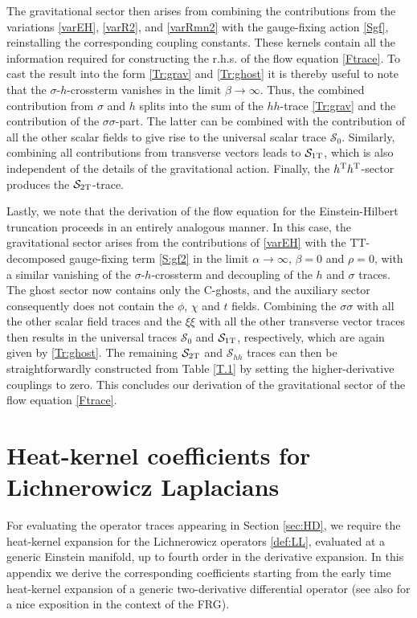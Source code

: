 \documentclass[preprint,preprintnumbers,amsmath,amssymb,nofootinbib,APS]{revtex4}
\let\s=\sigma \let\t=\tau   \let\vph=\varphi \let\ph=\phi \let\c=\chi
\newcommand{\cS}{\mathcal{S}}
\newcommand{\2}{\sqrt{2\,}}
\begin{document}
\begin{appendix}
\begin{table}[t!]
\end{table}
%
The gravitational sector then arises from combining the contributions from the variations \eqref{varEH}, \eqref{varR2}, and \eqref{varRmn2} with the gauge-fixing action \eqref{Sgf},  reinstalling the corresponding coupling constants. These kernels contain all the information required for constructing the r.h.s. of the flow equation \eqref{Ftrace}. To cast the result into the form \eqref{Tr:grav} and \eqref{Tr:ghost} it is thereby useful to note that the $\s$-$h$-crossterm vanishes in the limit $\beta \rightarrow \infty$. Thus, the combined contribution from $\s$ and $h$ splits into the sum of the $hh$-trace \eqref{Tr:grav} and the contribution of the $\s\s$-part. The latter can be combined with the contribution of all the other scalar fields to give rise to the universal scalar trace $\cS_0$. Similarly, combining all contributions from transverse vectors leads to $\cS_{\rm 1T}$, which is also independent of the details of the gravitational action. Finally, the $h^{\rm T}h^{\rm T}$-sector produces the $\cS_{\rm 2T}$-trace. 

Lastly, we note that the derivation of the flow equation for the Einstein-Hilbert truncation proceeds in an entirely analogous manner. In this case, the gravitational sector arises from the contributions of \eqref{varEH} with the TT-decomposed gauge-fixing term \eqref{S:gf2} in the limit $\alpha\rightarrow\infty$, $\beta = 0$ and $\rho = 0$, with a similar vanishing of the $\s$-$h$-crossterm and decoupling of the $h$ and $\s$ traces. The ghost sector now contains only the C-ghosts, and the auxiliary sector consequently does not contain the $\phi$, $\chi$ and $t$ fields. Combining the $\s\s$ with all the other scalar field traces and the $\xi\xi$ with all the other transverse vector traces then results in the universal traces $\cS_0$ and $\cS_{\rm 1T}$, respectively, which are again given by \eqref{Tr:ghost}.  The remaining $\cS_{\rm 2T}$ and $\cS_{hh}$ traces can then be straightforwardly constructed from Table \ref{T.1} by setting the higher-derivative couplings to zero. This concludes our derivation of the gravitational sector of the flow equation \eqref{Ftrace}.

\section{Heat-kernel coefficients for Lichnerowicz Laplacians}
\label{App:B}
For evaluating the operator traces appearing in Section \ref{sec:HD}, we require
the heat-kernel expansion for the Lichnerowicz operators \eqref{def:LL}, evaluated at a
generic Einstein manifold, up to fourth order in the derivative expansion. In this appendix
we derive the corresponding coefficients starting from the early time heat-kernel expansion of a generic
two-derivative differential operator \cite{Gilkey:1995mj,Avramidi:2000bm} (see also \cite{Codello:2008vh} for a nice exposition
in the context of the FRG).

\end{appendix}
\end{document}
